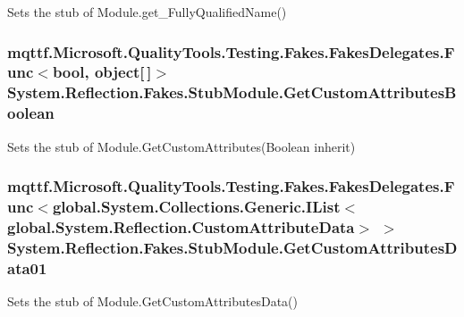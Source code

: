 Sets the stub of Module.\-get\-\_\-\-Fully\-Qualified\-Name()

\hypertarget{class_system_1_1_reflection_1_1_fakes_1_1_stub_module_ab307a6b2de4254993dc1d4213e01aa74}{
\subsubsection[{Get\-Custom\-Attributes\-Boolean}]{\setlength{\rightskip}{0pt plus 5cm}mqttf.\-Microsoft.\-Quality\-Tools.\-Testing.\-Fakes.\-Fakes\-Delegates.\-Func$<$bool, object\mbox{[}$\,$\mbox{]}$>$ System.\-Reflection.\-Fakes.\-Stub\-Module.\-Get\-Custom\-Attributes\-Boolean}}\label{class_system_1_1_reflection_1_1_fakes_1_1_stub_module_ab307a6b2de4254993dc1d4213e01aa74}


Sets the stub of Module.\-Get\-Custom\-Attributes(\-Boolean inherit)

\hypertarget{class_system_1_1_reflection_1_1_fakes_1_1_stub_module_ab9dd0b47de7bdbd7012fd27fa7496471}{
\subsubsection[{Get\-Custom\-Attributes\-Data01}]{\setlength{\rightskip}{0pt plus 5cm}mqttf.\-Microsoft.\-Quality\-Tools.\-Testing.\-Fakes.\-Fakes\-Delegates.\-Func$<$global.\-System.\-Collections.\-Generic.\-I\-List$<$global.\-System.\-Reflection.\-Custom\-Attribute\-Data$>$ $>$ System.\-Reflection.\-Fakes.\-Stub\-Module.\-Get\-Custom\-Attributes\-Data01}}\label{class_system_1_1_reflection_1_1_fakes_1_1_stub_module_ab9dd0b47de7bdbd7012fd27fa7496471}


Sets the stub of Module.\-Get\-Custom\-Attributes\-Data()

